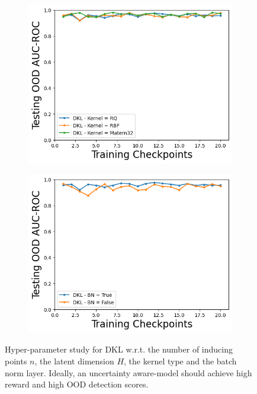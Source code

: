 \begin{figure}
\begin{subfigure}{.24\textwidth}
        \includegraphics[width=\textwidth]{sections/011_icml2022/resources/CartPoleOOD-v0-AUC-ROC-epistemic_-testing-hyperparameter-kernel-dkl.png}
    \end{subfigure}
        \begin{subfigure}{.24\textwidth}
        \includegraphics[width=\textwidth]{sections/011_icml2022/resources/CartPoleOOD-v0-AUC-ROC-epistemic_-testing-hyperparameter-bn-dkl.png}
    \end{subfigure}        
    \vspace{-3mm}
    \caption{Hyper-parameter study for DKL w.r.t. the number of inducing points $n$, the latent dimension $H$, the kernel type and the batch norm layer. Ideally, an uncertainty aware-model should achieve high reward and high OOD detection scores.}
    \label{fig:hyperparameter-dkl-cartpole}
    \vspace{-4mm}
\end{figure}